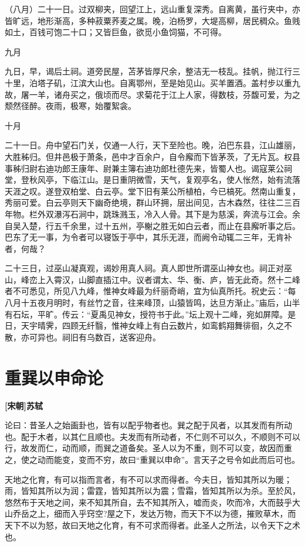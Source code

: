 \documentclass[UTF8,titlepage,oneside]{ctexbook}
\begin{document}
（八月）二十一日。过双柳夹，回望江上，远山重复深秀。自离黄，虽行夹中，亦皆旷远，地形渐高，多种菽粟荞麦之属。晚，泊杨罗，大堤高柳，居民稠众。鱼贱如土，百钱可饱二十口；又皆巨鱼，欲觅小鱼饲猫，不可得。


九月


九日，早，谒后土祠。道旁民屋，苫茅皆厚尺余，整洁无一枝乱。挂帆，抛江行三十里，泊塔子矶，江滨大山也。自离鄂州，至是始见山。买羊置酒。盖村步以重九故，屠一羊，诸舟买之，俄顷而尽。求菊花于江上人家，得数枝，芬馥可爱，为之颓然径醉。夜雨，极寒，始覆絮衾。


十月


二十一日。舟中望石门关，仅通一人行，天下至险也。晚，泊巴东县，江山雄丽，大胜秭归。但井邑极于萧条，邑中才百余户，自令廨而下皆茅茨，了无片瓦。权县事秭归尉右迪功郎王康年、尉兼主簿右迪功郎杜德先来，皆蜀人也。谒寇莱公祠堂，登秋风亭，下临江山。是日重阴微雪，天气，复观亭名，使人怅然，始有流落天涯之叹。遂登双柏堂、白云亭。堂下旧有莱公所植柏，今已槁死。然南山重复，秀丽可爱。白云亭则天下幽奇绝境，群山环拥，层出间见，古木森然，往往二三百年物。栏外双瀑泻石涧中，跳珠溅玉，冷入人骨。其下是为慈溪，奔流与江会。余自吴入楚，行五千余里，过十五州，亭榭之胜无如白云者，而止在县廨听事之后。巴东了无一事，为令者可以寝饭于亭中，其乐无涯，而阙令动辄二三年，无肯补者，何哉？


二十三日，过巫山凝真观，谒妙用真人祠。真人即世所谓巫山神女也。祠正对巫山，峰峦上入霄汉，山脚直插江中。议者谓太、华、衡、庐，皆无此奇。然十二峰者不可悉见，所见八九峰，惟神女峰最为纤丽奇峭，宜为仙真所托。祝史云：“每八月十五夜月明时，有丝竹之音，往来峰顶，山猿皆鸣，达旦方渐止。”庙后，山半有石坛，平旷。传云：“夏禹见神女，授符书于此。”坛上观十二峰，宛如屏障。是日，天宇晴霁，四顾无纤翳，惟神女峰上有白云数片，如鸾鹤翔舞徘徊，久之不散，亦可异也。祠旧有乌数百，送客迎舟。



\chapter*{重巽以申命论}
\begin{center}
	\textbf{[宋朝]苏轼}
\end{center}

论曰：昔圣人之始画卦也，皆有以配乎物者也。巽之配于风者，以其发而有所动也。配于木者，以其仁且顺也。夫发而有所动者，不仁则不可以久，不顺则不可以行，故发而仁，动而顺，而巽之道备矣。圣人以为不重，则不可以变，故因而重之，使之动而能变，变而不穷，故曰“重巽以申命”。言天子之号令如此而后可也。


天地之化育，有可以指而言者，有不可以求而得者。今夫日，皆知其所以为暖；雨，皆知其所以为润；雷霆，皆知其所以为震；雪霜，皆知其所以为杀。至於风，悠然布于天地之间，来不知其所自，去不知其所入，嘘而炎，吹而冷，大而鼓乎大山乔岳之上，细而入乎窍空?屋之下，发达万物，而天下不以为德，摧败草木，而天下不以为怒，故曰天地之化育，有不可求而得者。此圣人之所法，以令天下之术也。
\end{document}

